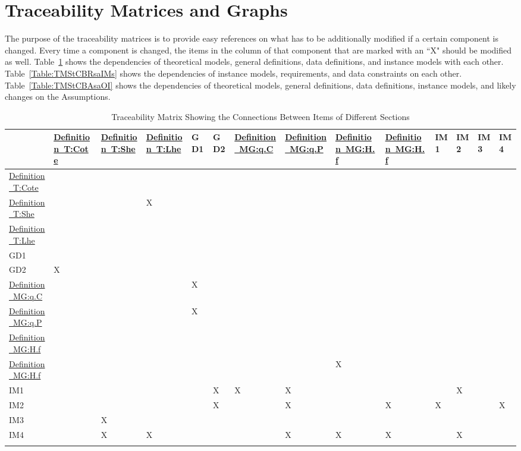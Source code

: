 \documentclass[12pt]{article}
\begin{document}
\section{Traceability Matrices and Graphs}
\label{Sec:TMaG}
The purpose of the traceability matrices is to provide easy references on what has to be additionally modified if a certain component is changed. Every time a component is changed, the items in the column of that component that are marked with an ``X" should be modified as well. Table~\ref{Table:TMStCBIoDS} shows the dependencies of theoretical models, general definitions, data definitions, and instance models with each other. Table~\ref{Table:TMStCBRsaIMs} shows the dependencies of instance models, requirements, and data constraints on each other. Table~\ref{Table:TMStCBAsaOI} shows the dependencies of theoretical models, general definitions, data definitions, instance models, and likely changes on the Assumptions.
\begin{longtable}{l l l l l l l l l l l l l l}
\toprule
 & \hyperref[T:Cote]{Definition~T:Cote} & \hyperref[T:She]{Definition~T:She} & \hyperref[T:Lhe]{Definition~T:Lhe} & GD1 & GD2 & \hyperref[MG:q.C]{Definition~MG:q.C} & \hyperref[MG:q.P]{Definition~MG:q.P} & \hyperref[MG:H.f]{Definition~MG:H.f} & \hyperref[MG:H.f]{Definition~MG:H.f} & IM1 & IM2 & IM3 & IM4
\\
\midrule
\hyperref[T:Cote]{Definition~T:Cote} &  &  &  &  &  &  &  &  &  &  &  &  & 
\\
\hyperref[T:She]{Definition~T:She} &  &  & X &  &  &  &  &  &  &  &  &  & 
\\
\hyperref[T:Lhe]{Definition~T:Lhe} &  &  &  &  &  &  &  &  &  &  &  &  & 
\\
GD1 &  &  &  &  &  &  &  &  &  &  &  &  & 
\\
GD2 & X &  &  &  &  &  &  &  &  &  &  &  & 
\\
\hyperref[MG:q.C]{Definition~MG:q.C} &  &  &  & X &  &  &  &  &  &  &  &  & 
\\
\hyperref[MG:q.P]{Definition~MG:q.P} &  &  &  & X &  &  &  &  &  &  &  &  & 
\\
\hyperref[MG:H.f]{Definition~MG:H.f} &  &  &  &  &  &  &  &  &  &  &  &  & 
\\
\hyperref[MG:H.f]{Definition~MG:H.f} &  &  &  &  &  &  &  & X &  &  &  &  & 
\\
IM1 &  &  &  &  & X & X & X &  &  &  & X &  & 
\\
IM2 &  &  &  &  & X &  & X &  & X & X &  &  & X
\\
IM3 &  & X &  &  &  &  &  &  &  &  &  &  & 
\\
IM4 &  & X & X &  &  &  & X & X & X &  & X &  & 
\\
\bottomrule
\caption{Traceability Matrix Showing the Connections Between Items of Different Sections}
\label{Table:TMStCBIoDS}
\end{longtable}
\end{document}
